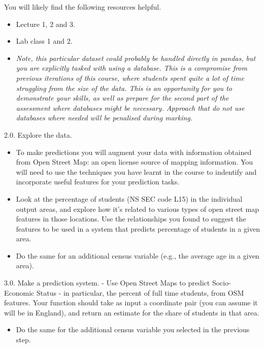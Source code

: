 \documentclass[11pt]{article}
\providecommand{\tightlist}{%
      \setlength{\itemsep}{0pt}\setlength{\parskip}{0pt}}
\begin{document}
You will likely find the following resources helpful.

\begin{itemize}
\item
  Lecture 1, 2 and 3.
\item
  Lab class 1 and 2.
\item
  \emph{Note, this particular dataset could probably be handled directly
  in pandas, but you are explicitly tasked with using a database. This
  is a compromise from previous iterations of this course, where
  students spent quite a lot of time struggling from the size of the
  data. This is an opportunity for you to demonstrate your skills, as
  well as prepare for the second part of the assessment where databases
  might be necessary. Approach that do not use databases where needed
  will be penalised during marking.}
\end{itemize}

2.0. Explore the data.

\begin{itemize}
\tightlist
\item
  To make predictions you will augment your data with information
  obtained from Open Street Map: an open license source of mapping
  information. You will need to use the techniques you have learnt in
  the course to indentify and incorporate useful features for your
  prediction tasks.
\item
  Look at the percentage of students (NS SEC code L15) in the individual
  output areas, and explore how it's related to various types of open
  street map features in those locations. Use the relationships you
  found to suggest the features to be used in a system that predicts
  percentage of students in a given area.
\item
  Do the same for an additional census variable (e.g., the average age
  in a given area).
\end{itemize}

3.0. Make a prediction system. - Use Open Street Maps to predict
Socio-Economic Status - in particular, the percent of full time
students, from OSM features. Your function should take as input a
coordinate pair (you can assume it will be in England), and return an
estimate for the share of students in that area.

\begin{itemize}
\tightlist
\item
  Do the same for the additional census variable you selected in the
  previous step.
\end{itemize}
\end{document}
